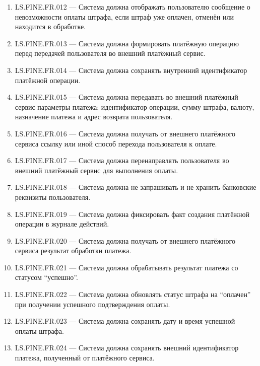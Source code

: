 \documentclass[12pt,a4paper]{article}
\begin{document}
\begin{enumerate}
		\item LS.FINE.FR.012 --- Система должна отображать пользователю сообщение о
		невозможности оплаты штрафа, если штраф уже оплачен, отменён или находится
		в обработке.
		
		\item LS.FINE.FR.013 --- Система должна формировать платёжную операцию перед
		передачей пользователя во внешний платёжный сервис.
		
		\item LS.FINE.FR.014 --- Система должна сохранять внутренний идентификатор
		платёжной операции.
		
		\item LS.FINE.FR.015 --- Система должна передавать во внешний платёжный сервис
		параметры платежа: идентификатор операции, сумму штрафа, валюту, назначение
		платежа и адрес возврата пользователя.
		
		\item LS.FINE.FR.016 --- Система должна получать от внешнего платёжного сервиса
		ссылку или иной способ перехода пользователя к оплате.
		
		\item LS.FINE.FR.017 --- Система должна перенаправлять пользователя во внешний
		платёжный сервис для выполнения оплаты.
		
		\item LS.FINE.FR.018 --- Система должна не запрашивать и не хранить банковские
		реквизиты пользователя.
		
		\item LS.FINE.FR.019 --- Система должна фиксировать факт создания платёжной
		операции в журнале действий.
		
		\item LS.FINE.FR.020 --- Система должна получать от внешнего платёжного сервиса
		результат обработки платежа.
		
		\item LS.FINE.FR.021 --- Система должна обрабатывать результат платежа со статусом
		``успешно''.
		
		\item LS.FINE.FR.022 --- Система должна обновлять статус штрафа на ``оплачен''
		при получении успешного подтверждения оплаты.
		
		\item LS.FINE.FR.023 --- Система должна сохранять дату и время успешной оплаты
		штрафа.
		
		\item LS.FINE.FR.024 --- Система должна сохранять внешний идентификатор платежа,
		полученный от платёжного сервиса.
		

\end{enumerate}
\end{document}
